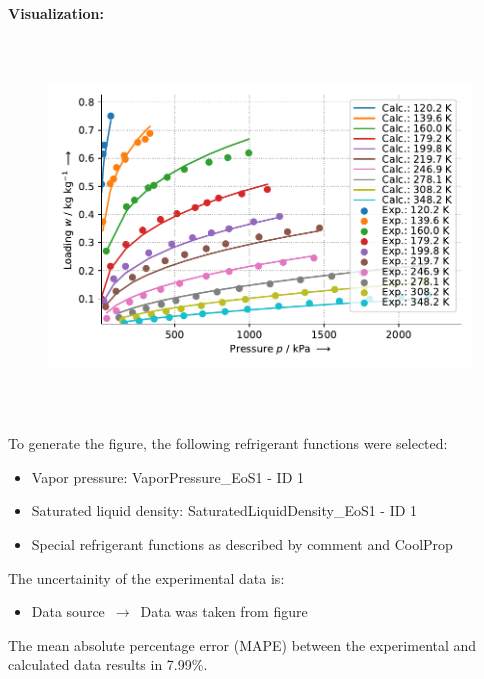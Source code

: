 \textbf{Visualization:}
%
\begin{figure}[!htp]
{\noindent\includegraphics[height=10cm, keepaspectratio]{figs/ads/ads_Methane_activated_carbon_powder_Maxsorb_III_DubininAstakhov_1.pdf}}
\end{figure}
%

To generate the figure, the following refrigerant functions were selected:
\begin{itemize}
\item Vapor pressure: VaporPressure\_EoS1 - ID 1
\item Saturated liquid density: SaturatedLiquidDensity\_EoS1 - ID 1
\item Special refrigerant functions as described by comment and CoolProp
\end{itemize}

The uncertainity of the experimental data is:
\begin{itemize}
\item Data source $\,\to\,$ Data was taken from figure
\end{itemize}

The mean absolute percentage error (MAPE) between the experimental and calculated data results in 7.99\%.
\FloatBarrier
\newpage
